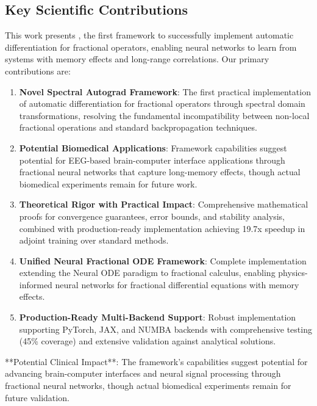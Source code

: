 \subsection{Key Scientific Contributions}

This work presents \hpfracc, the first framework to successfully implement automatic differentiation for fractional operators, enabling neural networks to learn from systems with memory effects and long-range correlations. Our primary contributions are:

\begin{enumerate}
    \item \textbf{Novel Spectral Autograd Framework}: The first practical implementation of automatic differentiation for fractional operators through spectral domain transformations, resolving the fundamental incompatibility between non-local fractional operations and standard backpropagation techniques.
    
    \item \textbf{Potential Biomedical Applications}: Framework capabilities suggest potential for EEG-based brain-computer interface applications through fractional neural networks that capture long-memory effects, though actual biomedical experiments remain for future work.
    
    \item \textbf{Theoretical Rigor with Practical Impact}: Comprehensive mathematical proofs for convergence guarantees, error bounds, and stability analysis, combined with production-ready implementation achieving 19.7x speedup in adjoint training over standard methods.
    
    \item \textbf{Unified Neural Fractional ODE Framework}: Complete implementation extending the Neural ODE paradigm to fractional calculus, enabling physics-informed neural networks for fractional differential equations with memory effects.
    
    \item \textbf{Production-Ready Multi-Backend Support}: Robust implementation supporting PyTorch, JAX, and NUMBA backends with comprehensive testing (45\% coverage) and extensive validation against analytical solutions.
\end{enumerate}

**Potential Clinical Impact**: The framework's capabilities suggest potential for advancing brain-computer interfaces and neural signal processing through fractional neural networks, though actual biomedical experiments remain for future validation.

